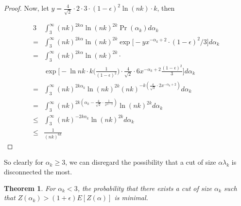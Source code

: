 \documentclass{acm_proc_article-sp}
\newtheorem{theorem}{Theorem}
\begin{document}
\begin{proof}
Now, let $y = \frac{4}{\sqrt{2}} \cdot 2 \cdot 3 \cdot (1-\epsilon)^2 \ln{(nk)} \cdot k$, then

\begin{alignat*}{3}
&\int_{3}^\infty (nk)^{2k \alpha} \ln{(nk)^{2k}} \Pr(\alpha_k) d\alpha_k \\
= &\int_{3}^\infty (nk)^{2k \alpha} \ln{(nk)^{2k}} \exp \bigg[-y x^{-\alpha_k + 2} \cdot (1-\epsilon)^2/3 \bigg] d\alpha_k \\
= &\int_{3}^\infty (nk)^{2k \alpha} \ln{(nk)^{2k}} \cdot \\ &\exp \bigg[-\ln{nk} \cdot k \bigg(\frac{1}{(1-\epsilon)^2}\bigg) \cdot \frac{4}{\sqrt{2}} \cdot 6x^{-\alpha_k + 2} \frac{(1-\epsilon)^2}{3} \bigg] d\alpha_k \\
= &\int_{3}^\infty (nk)^{2k \alpha_k} \ln{(nk)^{2k}} (nk)^{-k(\frac{4}{\sqrt{2}} \cdot 2x^{-\alpha_k + 2})} d\alpha_k \\
= &\int_{3}^\infty (nk)^{2 k(\alpha_k - \frac{4}{\sqrt{2}} \cdot \frac{1}{x^{\alpha-2}})} \ln{(nk)}^{2k}  d\alpha_k \\
\leq &\int_{3}^\infty (nk)^{-2k \alpha_k} \ln{(nk)^{2k}} d\alpha_k \\
\leq &\frac{1}{(nk)^{6k}} 
\end{alignat*}
\end{proof}

So clearly for $\alpha_k \geq 3$, we can disregard the possibility that a cut of size $\alpha \lambda_k$ is disconnected the most.

\begin{theorem}
For $\alpha_k < 3$, the probability that there exists a cut of size $\alpha_k$  such that $Z(\alpha_k) > (1+\epsilon) E[Z(\alpha)]$ is minimal. 
\end{theorem}
\end{document}
